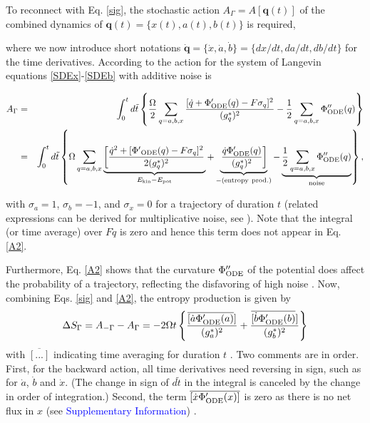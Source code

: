 \documentclass[aps,prl,reprint,singlecolumn,superscriptaddress]{revtex4}
\begin{document}
{To reconnect with Eq. \ref{sig}, the stochastic action $A_\Gamma=A[{\mathbf q}(t)]$ of the combined dynamics of 
${\mathbf q}(t)=\{x(t),a(t),b(t)\}$ is required, {where we now introduce short notations 
$\dot {\mathbf q}=\{\dot x,\dot a, \dot b\}=\{dx/dt, da/dt, db/dt\}$ for the time derivatives.
According to \cite{arnold99,navarra13} the action for the system of Langevin equations \ref{SDEx}-\ref{SDEb} with additive noise is
\begin{widetext}
\begin{eqnarray}
A_\Gamma&=&\int_0^td\tilde t\left\{\frac{\Omega}{2}\sum_{q=a,b,x}\frac{[\dot q + \Phi'_{\rm ODE}(q)
-F\sigma_{q}]^2}{(g_{q}^*)^2}-
\frac{1}{2}\sum_{q=a,b,x}\Phi''_{\rm ODE}(q)\right\}\nonumber\\
&=&\int_0^td\tilde t\left\{\Omega\sum_{q=a,b,x}\underbrace{\left[\frac{\dot q^2 + [{\Phi'}_{\rm ODE}(q)-F\sigma_{q}]^2}{2(g_q^*)^2}\right.}_{E_{\rm kin}-E_{\rm pot}}
+\underbrace{\left.\frac{\dot q\Phi'_{\rm ODE}(q)}{(g_q^*)^2}\right]}_{\rm -(entropy\ prod.)}
-\underbrace{\frac{1}{2}\sum_{q=a,b,x}\Phi''_{\rm ODE}(q)}_{\rm noise}\right\},\label{A2}
\end{eqnarray}
\end{widetext}
with $\sigma_{a}=1$, $\sigma_b=-1$, and $\sigma_x=0$ for a trajectory of duration $t$ (related expressions can be derived for multiplicative noise, 
see \cite{haenggi89,wio89,zinn-justin96,tang14}). Note that the integral (or time average) over $F\dot q$ is zero and hence this term does not appear 
in Eq. \ref{A2}.} Furthermore, Eq. \ref{A2} shows that the curvature $\Phi''_{\rm ODE}$ of the potential does affect the probability of a trajectory, 
reflecting the disfavoring of high noise \cite{seifert12}. Now, combining Eqs. \ref{sig} and \ref{A2}, the entropy production is given by 
\begin{equation}
\Delta S_\Gamma=A_{-\Gamma} - A_\Gamma =-2\Omega t\left\{\frac{\overline{[\dot a\Phi'_{\rm ODE}(a)}]}{(g_a^*)^2}
+\frac{\overline{[\dot b\Phi'_{\rm ODE}(b)}]}{(g_b^*)^2}\right\}
\end{equation}
with $\overline{[...]}$ indicating time averaging for duration $t$ \cite{hatano01,seifert05}. Two comments are
in order. First, for the backward action, all time derivatives need reversing in sign, such as for $\dot a$, $\dot b$ and
$\dot x$. (The change in sign of $d\tilde t$ in the integral is canceled by the change in order of integration.)
Second, the term $\overline{[\dot x\Phi'_{\rm ODE}(x)]}$ is zero as there is no net flux in $x$ (see \textcolor{blue}{Supplementary Information}) 
\cite{tome97,tome06}.
 
}
\end{document}
